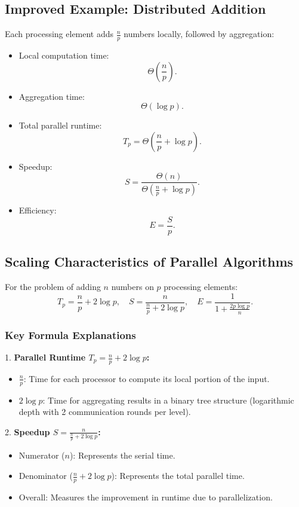 \documentclass[12pt,a4paper]{article}
\begin{document}
\subsection{Improved Example: Distributed Addition}
Each processing element adds \( \frac{n}{p} \) numbers locally, followed by aggregation:
\begin{itemize}
    \item Local computation time:
    \[
    \Theta\left(\frac{n}{p}\right).
    \]
    \item Aggregation time:
    \[
    \Theta(\log p).
    \]
    \item Total parallel runtime:
    \[
    T_p = \Theta\left(\frac{n}{p} + \log p\right).
    \]
    \item Speedup:
    \[
    S = \frac{\Theta(n)}{\Theta\left(\frac{n}{p} + \log p\right)}.
    \]
    \item Efficiency:
    \[
    E = \frac{S}{p}.
    \]
\end{itemize}

\subsection{Scaling Characteristics of Parallel Algorithms}
For the problem of adding \( n \) numbers on \( p \) processing elements:
\[
T_p = \frac{n}{p} + 2 \log p, \quad S = \frac{n}{\frac{n}{p} + 2 \log p}, \quad E = \frac{1}{1 + \frac{2p \log p}{n}}.
\]

\subsubsection{Key Formula Explanations}
1. \textbf{Parallel Runtime \( T_p = \frac{n}{p} + 2 \log p \):}
    \begin{itemize}
        \item \( \frac{n}{p} \): Time for each processor to compute its local portion of the input.
        \item \( 2 \log p \): Time for aggregating results in a binary tree structure (logarithmic depth with 2 communication rounds per level).
    \end{itemize}

2. \textbf{Speedup \( S = \frac{n}{\frac{n}{p} + 2 \log p} \):}
    \begin{itemize}
        \item Numerator (\( n \)): Represents the serial time.
        \item Denominator (\( \frac{n}{p} + 2 \log p \)): Represents the total parallel time.
        \item Overall: Measures the improvement in runtime due to parallelization.
    \end{itemize}
\end{document}
